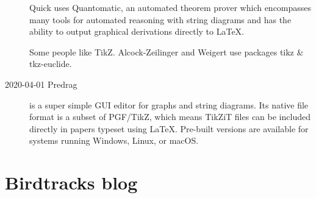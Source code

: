 \begin{description}
Quick  uses 
{Quantomatic}, an automated theorem prover which  encompasses many tools for
automated reasoning with string diagrams and has the ability to output
graphical derivations directly to LaTeX.

Some people like  {TikZ}.
Alcock-Zeilinger and Weigert use packages {tikz} \& {tkz-euclide}.

\item[2020-04-01 Predrag]
 is a super simple GUI editor for
graphs and string diagrams. Its native file format is a subset of
PGF/TikZ, which means TikZiT files can be included directly in papers
typeset using LaTeX. Pre-built versions are available for systems running
Windows, Linux, or macOS.

\end{description}

\section{Birdtracks blog}
\label{s-birdtrBlog}

